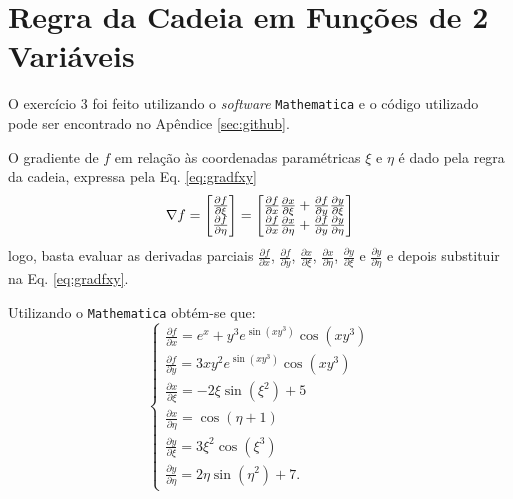 \section{Regra da Cadeia em Fun\c{c}\~oes de 2 Vari\'aveis} \label{sec:ex3}
O exerc\'icio 3 foi feito utilizando o \textit{software} \texttt{Mathematica} e o c\'odigo utilizado pode ser encontrado no Ap\^endice \ref{sec:github}. 

O gradiente de $f$ em rela\c{c}\~ao \`as coordenadas param\'etricas $\xi$ e $\eta$ \'e dado pela regra da cadeia, expressa pela Eq. \eqref{eq:gradfxy}
\begin{equation}
    \label{eq:gradfxy}   
    \nabla f = \begin{bmatrix}
        \frac{\partial f}{\partial \xi} \\
        \frac{\partial f}{\partial \eta}
    \end{bmatrix} = 
    \begin{bmatrix}
        \frac{\partial f}{\partial x} \frac{\partial x}{\partial \xi} + \frac{\partial f}{\partial y} \frac{\partial y}{\partial \xi} \\
        \frac{\partial f}{\partial x} \frac{\partial x}{\partial \eta} + \frac{\partial f}{\partial y} \frac{\partial y}{\partial \eta}
    \end{bmatrix}
\end{equation}
logo, basta evaluar as derivadas parciais $\frac{\partial f}{\partial x}$, $\frac{\partial f}{\partial y}$, $\frac{\partial x}{\partial \xi}$, $\frac{\partial x}{\partial \eta}$, $\frac{\partial y}{\partial \xi}$ e $\frac{\partial y}{\partial \eta}$  e depois substituir na Eq. \eqref{eq:gradfxy}.

Utilizando o \texttt{Mathematica} obt\'em-se que: 
\begin{equation*}
    \begin{cases}
        \frac{\partial f}{\partial x} = e^x + y^3 e^{\sin \left(x
        y^3\right)} \cos \left(x
        y^3\right) \\ 
        \frac{\partial f}{\partial y} = 3 x y^2 e^{\sin \left(x
        y^3\right)} \cos \left(x
        y^3\right) \\
        \frac{\partial x}{\partial \xi} = -2 \xi \sin \left(\xi^2\right) + 5 \\
        \frac{\partial x}{\partial \eta} = \cos \left(\eta + 1\right) \\
        \frac{\partial y}{\partial \xi} = 3 \xi^2 \cos \left(\xi^3\right) \\
        \frac{\partial y}{\partial \eta} = 2 \eta \sin \left(\eta^2\right) + 7.
    \end{cases}
\end{equation*}

